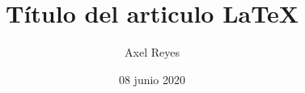 \documentclass[letterpaper]{article} %
\title{Título del articulo \LaTeX} %
\author{Axel Reyes} %
\date{08 junio 2020} %
\begin{document}
    \maketitle %
      
    \renewcommand{\tablename}{Tabla} %

    
    

    
\end{document}
